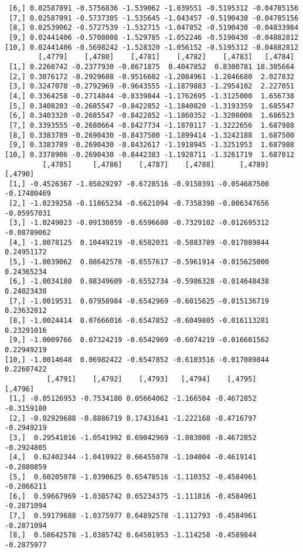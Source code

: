 \documentclass[
  letterpaper,
  DIV=11,
  numbers=noendperiod]{scrreprt}
\begin{document}
\begin{verbatim}
 [6,] 0.02587891 -0.5756836 -1.539062 -1.039551 -0.5195312 -0.04785156
 [7,] 0.02587891 -0.5737305 -1.535645 -1.043457 -0.5190430 -0.04785156
 [8,] 0.02539062 -0.5727539 -1.532715 -1.047852 -0.5190430 -0.04833984
 [9,] 0.02441406 -0.5708008 -1.529785 -1.052246 -0.5190430 -0.04882812
[10,] 0.02441406 -0.5698242 -1.528320 -1.056152 -0.5195312 -0.04882812
        [,4779]    [,4780]    [,4781]    [,4782]    [,4783]   [,4784]
 [1,] 0.2260742 -0.2377930 -0.8671875  0.4047852  0.8300781 18.305664
 [2,] 0.3076172 -0.2929688 -0.9516602 -1.2084961 -1.2846680  2.027832
 [3,] 0.3247070 -0.2792969 -0.9643555 -1.1879883 -1.2954102  2.227051
 [4,] 0.3364258 -0.2714844 -0.8339844 -1.1762695 -1.3125000  1.656738
 [5,] 0.3408203 -0.2685547 -0.8422852 -1.1840820 -1.3193359  1.685547
 [6,] 0.3403320 -0.2685547 -0.8422852 -1.1860352 -1.3208008  1.686523
 [7,] 0.3393555 -0.2680664 -0.8427734 -1.1870117 -1.3222656  1.687988
 [8,] 0.3383789 -0.2690430 -0.8437500 -1.1899414 -1.3242188  1.687500
 [9,] 0.3383789 -0.2690430 -0.8432617 -1.1918945 -1.3251953  1.687988
[10,] 0.3378906 -0.2690430 -0.8442383 -1.1928711 -1.3261719  1.687012
         [,4785]     [,4786]    [,4787]    [,4788]      [,4789]     [,4790]
 [1,] -0.4526367 -1.05029297 -0.6728516 -0.9150391 -0.054687500 -0.17480469
 [2,] -1.0239258 -0.11865234 -0.6621094 -0.7358398 -0.006347656 -0.05957031
 [3,] -1.0249023 -0.09130859 -0.6596680 -0.7329102 -0.012695312 -0.08789062
 [4,] -1.0078125  0.10449219 -0.6582031 -0.5883789 -0.017089844  0.24951172
 [5,] -1.0039062  0.08642578 -0.6557617 -0.5961914 -0.015625000  0.24365234
 [6,] -1.0034180  0.08349609 -0.6552734 -0.5986328 -0.014648438  0.24023438
 [7,] -1.0019531  0.07958984 -0.6542969 -0.6015625 -0.015136719  0.23632812
 [8,] -1.0024414  0.07666016 -0.6547852 -0.6049805 -0.016113281  0.23291016
 [9,] -1.0009766  0.07324219 -0.6542969 -0.6074219 -0.016601562  0.22949219
[10,] -1.0014648  0.06982422 -0.6547852 -0.6103516 -0.017089844  0.22607422
          [,4791]    [,4792]    [,4793]   [,4794]    [,4795]    [,4796]
 [1,] -0.05126953 -0.7534180 0.05664062 -1.166504 -0.4672852 -0.3159180
 [2,] -0.02929688 -0.8886719 0.17431641 -1.222168 -0.4716797 -0.2949219
 [3,]  0.29541016 -1.0541992 0.69042969 -1.083008 -0.4672852 -0.2924805
 [4,]  0.62402344 -1.0419922 0.66455078 -1.104004 -0.4619141 -0.2880859
 [5,]  0.60205078 -1.0390625 0.65478516 -1.110352 -0.4584961 -0.2866211
 [6,]  0.59667969 -1.0385742 0.65234375 -1.111816 -0.4584961 -0.2871094
 [7,]  0.59179688 -1.0375977 0.64892578 -1.112793 -0.4584961 -0.2871094
 [8,]  0.58642578 -1.0385742 0.64501953 -1.114258 -0.4589844 -0.2875977

\end{verbatim}
\end{document}
